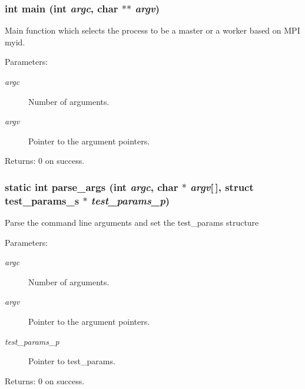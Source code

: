 \subsubsection{\setlength{\rightskip}{0pt plus 5cm}int main (int {\em argc}, char $\ast$$\ast$ {\em argv})}\label{s3asim_8c_3c04138a5bfe5d72780bb7e82a18e627}


Main function which selects the process to be a master or a worker based on MPI myid.

\begin{Desc}
\item[Parameters:]
\begin{description}
\item[{\em argc}]Number of arguments. \item[{\em argv}]Pointer to the argument pointers. \end{description}
\end{Desc}
\begin{Desc}
\item[Returns:]0 on success. \end{Desc}
\subsubsection{\setlength{\rightskip}{0pt plus 5cm}static int parse\_\-args (int {\em argc}, char $\ast$ {\em argv}[$\,$], struct \bf{test\_\-params\_\-s} $\ast$ {\em test\_\-params\_\-p})\hspace{0.3cm}{\tt  [static]}}\label{s3asim_8c_c433ff9248d958d9523e0cd08226efec}


Parse the command line arguments and set the test\_\-params structure

\begin{Desc}
\item[Parameters:]
\begin{description}
\item[{\em argc}]Number of arguments. \item[{\em argv}]Pointer to the argument pointers. \item[{\em test\_\-params\_\-p}]Pointer to test\_\-params. \end{description}
\end{Desc}
\begin{Desc}
\item[Returns:]0 on success. \end{Desc}

